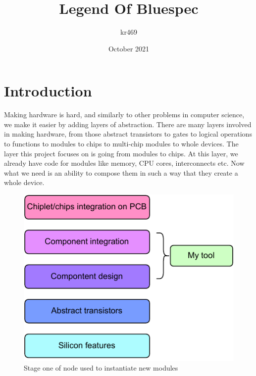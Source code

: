 \documentclass[12pt]{report}
\title{Legend Of Bluespec}
\author{kr469 }
\date{October 2021}
\begin{document}
\maketitle
\tableofcontents

\chapter{Introduction}
Making hardware is hard, and similarly to other problems in computer science, we make it easier by adding layers of abstraction. There are many layers involved in making hardware, from those abstract transistors to gates to logical operations to functions to modules to chips to multi-chip modules to whole devices. The layer this project focuses on is going from modules to chips. At this layer, we already have code for modules like memory, CPU cores, interconnects etc. Now what we need is an ability to compose them in such a way that they create a whole device. 
\begin{figure}[h!]
    \centering
    
    \includegraphics[width=0.5\columnwidth]{pdfExports/LargeMapLayersOfAbstraction.pdf}
    \caption{Stage one of node used to instantiate new modules}
\end{figure}
%     
\end{document}
